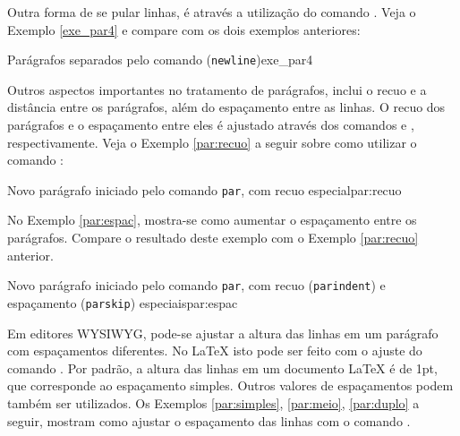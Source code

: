 Outra forma de se pular linhas, é através a utilização do comando \texttt{\newline}. Veja o Exemplo \ref{exe_par4} e compare com os dois exemplos anteriores:

\begin{texexptitled}[breakable,enhanced,middle=2mm]{Parágrafos separados pelo comando ({\tt newline})}{exe_par4}
\lipsumsentence[1-4]
\newline
\lipsumsentence[5-8]
\end{texexptitled}

Outros aspectos importantes no tratamento de parágrafos, inclui o recuo e a distância entre os parágrafos, além do espaçamento entre as linhas. O recuo dos parágrafos e o espaçamento entre eles é ajustado através dos comandos \texttt{\parindent} e \texttt{\parskip}, respectivamente. Veja o Exemplo \ref{par:recuo} a seguir sobre como utilizar o comando \texttt{\parindent}:

\begin{texexptitled}[breakable,enhanced,middle=2mm]{Novo parágrafo iniciado pelo comando {\tt par}, com recuo especial}{par:recuo}
\setlength{\parindent}{3em}

\lipsumsentence[1-4] \par
\lipsumsentence[5-8]
\end{texexptitled} 

No Exemplo \ref{par:espac}, mostra-se como aumentar o espaçamento entre os parágrafos. Compare o resultado deste exemplo com o Exemplo \ref{par:recuo} anterior.

\begin{texexptitled}[breakable,enhanced,middle=2mm]{Novo parágrafo iniciado pelo comando {\tt par}, com recuo ({\tt parindent}) e espaçamento ({\tt parskip}) especiais}{par:espac}
\setlength{\parindent}{3em}
\setlength{\parskip}{1em}

\lipsumsentence[1-4] \par
\lipsumsentence[5-8]
\end{texexptitled}

Em editores WYSIWYG, pode-se ajustar a altura das linhas em um parágrafo com espaçamentos diferentes. No \LaTeX{} isto pode ser feito com o ajuste do comando \texttt{\baselinestretch}. Por padrão, a altura das linhas em um documento \LaTeX{} é de {1pt}, que corresponde ao espaçamento simples. Outros valores de espaçamentos podem também ser utilizados. Os Exemplos \ref{par:simples}, \ref{par:meio}, \ref{par:duplo} a seguir, mostram como ajustar o espaçamento das linhas com o comando \texttt{\baselinestretch}.

